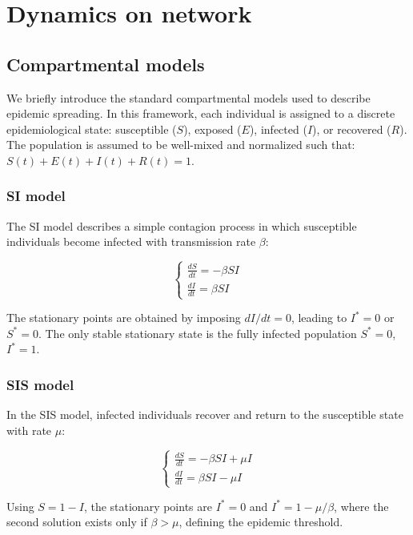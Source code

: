 \chapter{Dynamics on network}
\section{Compartmental models}  \label{app:comp_models}

We briefly introduce the standard compartmental models used to describe epidemic spreading. In this framework, each individual is assigned to a discrete epidemiological state: susceptible ($S$), exposed ($E$), infected ($I$), or recovered ($R$). The population is assumed to be well-mixed and normalized such that: $S(t)+E(t)+I(t)+R(t)=1$.

\subsection{SI model}

The SI model describes a simple contagion process in which susceptible individuals become infected with transmission rate $\beta$:

\begin{equation}
\begin{cases}
\frac{dS}{dt} = -\beta S I \\
\frac{dI}{dt} = \beta S I
\end{cases}
\end{equation}

The stationary points are obtained by imposing $dI/dt=0$, leading to $I^*=0$ or $S^*=0$. The only stable stationary state is the fully infected population $S^*=0$, $I^*=1$.

\subsection{SIS model}

In the SIS model, infected individuals recover and return to the susceptible state with rate $\mu$:

\begin{equation}
\begin{cases}
\frac{dS}{dt} = -\beta S I + \mu I \\
\frac{dI}{dt} = \beta S I - \mu I
\end{cases}
\end{equation}

Using $S=1-I$, the stationary points are $I^*=0$ and $I^*=1-\mu/\beta$, where the second solution exists only if $\beta>\mu$, defining the epidemic threshold.

